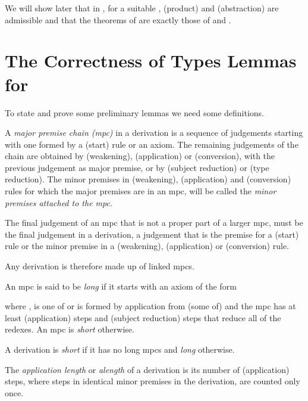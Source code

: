 \documentclass{LMCS}
\begin{document}
\begin{thm}
{  We will show later that in , for a suitable
  , (product) and (abstraction) are admissible and that the
  theorems of  are exactly those of  and
  .

\section{The Correctness of Types Lemmas for \texorpdfstring{}{lambda X{h+}}}\label{S:CTL}

 \noindent To state and prove some preliminary lemmas we need some
  definitions.

\begin{defi}\label{D:mpc}
  A \emph{major premise chain (mpc)} in a derivation is a sequence of
  judgements starting with one formed by a (start) rule or an
  axiom. The remaining judgements of the chain are obtained by
  (weakening), (application) or (conversion), with the previous
  judgement as major premise, or by (subject reduction) or (type
  reduction). The minor premises in (weakening), (application) and
  (conversion) rules for which the major premises are in an mpc, will
  be called the \emph{minor premises attached to the mpc}.
\end{defi}

  The final judgement of an mpc that is not a proper part of a larger
  mpc, must be the final judgement in a derivation, a judgement that
  is the premise for a (start) rule or the minor premise in a
  (weakening), (application) or (conversion) rule.

  Any derivation is therefore made up of linked mpcs.


\begin{defi}\label{D:losh}
   An mpc is said to be \emph{long} if it starts with an axiom of the form

  where ,  is one of  or is formed by
  application from (some of)  and the mpc has at least
   (application) steps and (subject reduction) steps that reduce
  all of the   redexes. An mpc is \emph{short}
  otherwise.

  A derivation is \emph{short} if it has no long mpcs and \emph{long}
  otherwise.
\end{defi}

\begin{defi}\label{D:alength}
  The \emph{application length} or \emph{alength} of a derivation is
  its number of (application) steps, where steps in identical minor
  premises in the derivation, are counted only once.


\end{defi}}
\end{thm}
\end{document}
